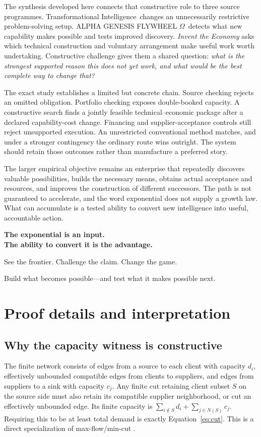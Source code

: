 \documentclass[11pt,a4paper]{article}
\newcommand{\genesis}{ALPHA GENESIS FLYWHEEL $\Omega$}
\newcommand{\ti}{Transformational Intelligence}
\begin{document}
The synthesis developed here connects that constructive role to three source programmes. \ti\ changes an unnecessarily restrictive problem-solving setup. \genesis\ detects what new capability makes possible and tests improved discovery. \emph{Invent the Economy} asks which technical construction and voluntary arrangement make useful work worth undertaking. Constructive challenge gives them a shared question: \emph{what is the strongest supported reason this does not yet work, and what would be the best complete way to change that?}

The exact study establishes a limited but concrete chain. Source checking rejects an omitted obligation. Portfolio checking exposes double-booked capacity. A constructive search finds a jointly feasible technical--economic package after a declared capability-cost change. Financing and supplier-acceptance controls still reject unsupported execution. An unrestricted conventional method matches, and under a stronger contingency the ordinary route wins outright. The system should retain those outcomes rather than manufacture a preferred story.

The larger empirical objective remains an enterprise that repeatedly discovers valuable possibilities, builds the necessary means, obtains actual acceptance and resources, and improves the construction of different successors. The path is not guaranteed to accelerate, and the word exponential does not supply a growth law. What can accumulate is a tested ability to convert new intelligence into useful, accountable action.

\begin{insight}
\centering
{\sffamily\large\bfseries\color{Plum}The exponential is an input.\\The ability to convert it is the advantage.}\par
\vspace{5pt}
See the frontier. Challenge the claim. Change the game.\par
Build what becomes possible---and test what it makes possible next.
\end{insight}

\clearpage
\appendix
\section{Proof details and interpretation}
\subsection{Why the capacity witness is constructive}
The finite network consists of edges from a source to each client with capacity $d_i$, effectively unbounded compatible edges from clients to suppliers, and edges from suppliers to a sink with capacity $c_j$. Any finite cut retaining client subset $S$ on the source side must also retain its compatible supplier neighborhood, or cut an effectively unbounded edge. Its finite capacity is $\sum_{i\notin S}d_i+\sum_{j\in N(S)}c_j$. Requiring this to be at least total demand is exactly Equation~\eqref{eq:cut}. This is a direct specialization of max-flow/min-cut \cite{ford}.
\end{document}
